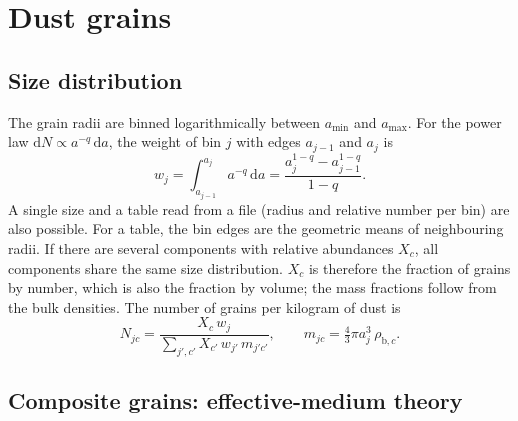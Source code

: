 \documentclass[11pt,a4paper]{article}
\newcommand{\dd}{\mathrm{d}}
\begin{document}
\section{Dust grains}
\label{sec:grains}

\subsection{Size distribution}

The grain radii are binned logarithmically between $a_\mathrm{min}$ and $a_\mathrm{max}$. For the
power law $\dd N \propto a^{-q}\,\dd a$, the weight of bin $j$ with edges $a_{j-1}$ and $a_j$ is
\begin{equation}
w_j = \int_{a_{j-1}}^{a_j} a^{-q}\,\dd a = \frac{a_j^{1-q}-a_{j-1}^{1-q}}{1-q}.
\end{equation}
A single size and a table read from a file (radius and relative number per bin) are also
possible. For a table, the bin edges are the geometric means of neighbouring radii. If there are
several components with relative abundances $X_c$, all components share the same size
distribution. $X_c$ is therefore the fraction of grains by number, which is also the fraction by
volume; the mass fractions follow from the bulk densities. The number of grains per kilogram of dust is
\begin{equation}
N_{jc} = \frac{X_c\,w_j}{\sum_{j',c'} X_{c'}\,w_{j'}\,m_{j'c'}},\qquad
m_{jc} = \tfrac{4}{3}\pi a_j^3\,\rho_{\mathrm{b},c}.
\end{equation}

\subsection{Composite grains: effective-medium theory}
\label{sec:emt}
\end{document}
